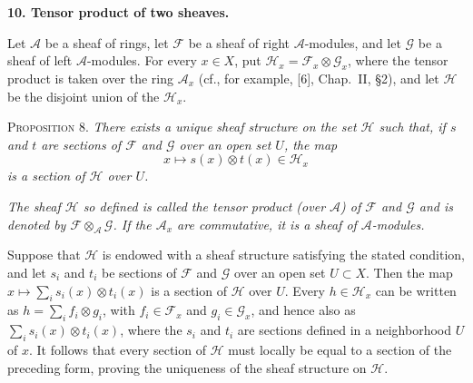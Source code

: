 
\medskip
{}\label{fac:I:1:no:10}
\textbf{10. Tensor product of two sheaves.}

Let $\mathcal{A}$ be a sheaf of rings, let $\mathcal{F}$ be a sheaf of right $\mathcal{A}$-modules, and let $\mathcal{G}$ be a sheaf of left $\mathcal{A}$-modules. For every $x\in X$, put $\mathcal{H}_x=\mathcal{F}_x\otimes\mathcal{G}_x$, where the tensor product is taken over the ring $\mathcal{A}_x$ (cf., for example, [6], Chap.~II, \S2), and let $\mathcal{H}$ be the disjoint union of the $\mathcal{H}_x$.

\medskip
{}\label{fac:I:1:no:10:prop:8}
\textsc{Proposition 8.} \textit{There exists a unique sheaf structure on the set $\mathcal{H}$ such that, if $s$ and $t$ are sections of $\mathcal{F}$ and $\mathcal{G}$ over an open set $U$, the map}
\[
x\longmapsto s(x)\otimes t(x)\in\mathcal{H}_x
\]
\textit{is a section of $\mathcal{H}$ over $U$.}

\textit{The sheaf $\mathcal{H}$ so defined is called the tensor product (over $\mathcal{A}$) of $\mathcal{F}$ and $\mathcal{G}$ and is denoted by $\mathcal{F}\otimes_{\mathcal{A}}\mathcal{G}$. If the $\mathcal{A}_x$ are commutative, it is a sheaf of $\mathcal{A}$-modules.}

Suppose that $\mathcal{H}$ is endowed with a sheaf structure satisfying the stated condition, and let $s_i$ and $t_i$ be sections of $\mathcal{F}$ and $\mathcal{G}$ over an open set $U\subset X$. Then the map $x\mapsto\sum_i s_i(x)\otimes t_i(x)$ is a section of $\mathcal{H}$ over $U$. Every $h\in\mathcal{H}_x$ can be written as $h=\sum_i f_i\otimes g_i$, with $f_i\in\mathcal{F}_x$ and $g_i\in\mathcal{G}_x$, and hence also as $\sum_i s_i(x)\otimes t_i(x)$, where the $s_i$ and $t_i$ are sections defined in a neighborhood $U$ of $x$. It follows that every section of $\mathcal{H}$ must locally be equal to a section of the preceding form, proving the uniqueness of the sheaf structure on $\mathcal{H}$.

